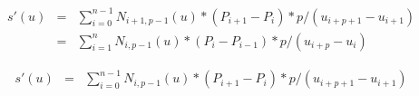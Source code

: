 \documentclass{article}
\begin{document}
\begin{eqnarray*}  s'(u) &=& \sum_{i=0}^{n-1} N_{i+1,p-1}(u)    *
                             (P_{i+1} - P_{i}) *
                             p / (u_{i+p+1}-u_{i+1}) \\
        &=& \sum_{i=1}^{n} N_{i,p-1}(u)      *
                           (P_{i} - P_{i-1}) *
                           p / (u_{i+p}-u_{i})
\end{eqnarray*}
\pagebreak

\begin{eqnarray*}  s'(u) &=& \sum_{i=0}^{n-1} N_{i,p-1}(u)      *
                             (P_{i+1} - P_{i}) *
                             p / (u_{i+p+1}-u_{i+1})
\end{eqnarray*}
\pagebreak
\end{document}
